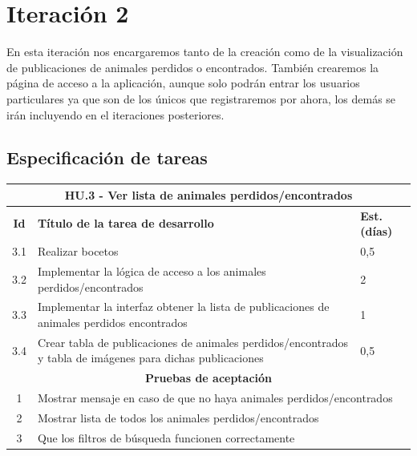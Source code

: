 \section{Iteración 2}
En esta iteración nos encargaremos tanto de la creación como de la visualización de publicaciones de animales perdidos o encontrados. También crearemos la página de acceso a la aplicación, aunque solo podrán entrar los usuarios particulares ya que son de los únicos que registraremos por ahora, los demás se irán incluyendo en el iteraciones posteriores.  \\

\subsection{Especificación de tareas}
\begin{table}[H]
	\centering
\begin{tabular}{|c|p{9.5cm}|p{1cm}|}
	\hline
	\multicolumn{3}{|c|}{\textbf{HU.3 - Ver lista de animales perdidos/encontrados}} \\
	\hline
	\textbf{Id} & \textbf{Título de la tarea de desarrollo} & \textbf{Est. (días)} \\
	\hline
	3.1 & Realizar bocetos & 0,5 \\ \hline
	3.2 &  Implementar la lógica de acceso a los animales perdidos/encontrados& 2 \\ \hline
	3.3 &  Implementar la interfaz obtener la lista de publicaciones de animales perdidos encontrados& 1 \\ \hline
	3.4 & Crear tabla de publicaciones de animales perdidos/encontrados y tabla de imágenes para dichas publicaciones & 0,5\\ \hline
	\multicolumn{3}{|c|}{\textbf{Pruebas de aceptación}} \\ \hline
	1 & \multicolumn{2}{|p{10cm}|}{Mostrar mensaje en caso de que no haya animales perdidos/encontrados} \\ \hline
	2 & \multicolumn{2}{|p{10cm}|}{Mostrar lista de todos los animales perdidos/encontrados} \\ \hline
	3 & \multicolumn{2}{|p{10cm}|}{Que los filtros de búsqueda funcionen correctamente} \\ \hline
\end{tabular}
\end{table}

